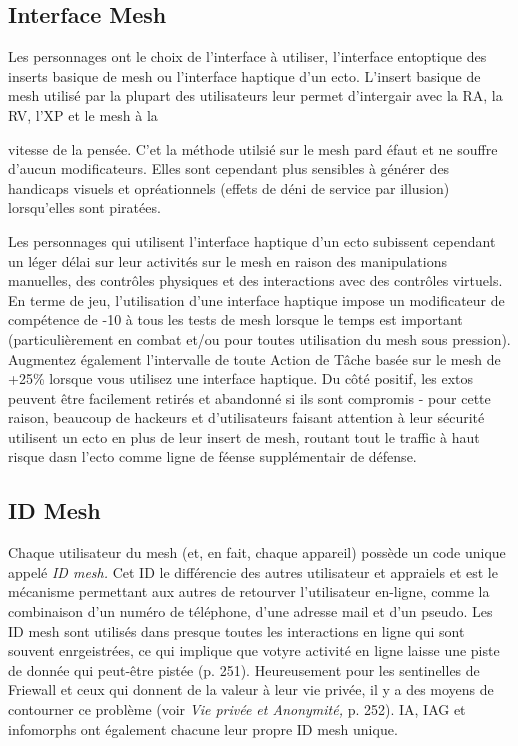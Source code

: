 \subsection{Interface Mesh} 

Les personnages ont le choix de l'interface à utiliser, l'interface entoptique des inserts basique de mesh ou l'interface haptique d'un ecto. L'insert basique de mesh utilisé par la plupart des utilisateurs leur permet d'intergair avec la RA, la RV, l'XP et le mesh à la 

vitesse de la pensée. C'et la méthode utilsié sur le mesh pard éfaut et ne souffre d'aucun modificateurs. Elles sont cependant plus sensibles à générer des handicaps visuels et opréationnels (effets de déni de service par illusion) lorsqu'elles sont piratées. 

Les personnages qui utilisent l'interface haptique d'un ecto subissent cependant un léger délai sur leur activités sur le mesh en raison des manipulations manuelles, des contrôles physiques et des interactions avec des contrôles virtuels. En terme de jeu, l'utilisation d'une interface haptique impose un modificateur de compétence de -10 à tous les tests de mesh lorsque le temps est important (particulièrement en combat et/ou pour toutes utilisation du mesh sous pression). Augmentez également l'intervalle de toute Action de Tâche basée sur le mesh de +25\% lorsque vous utilisez une interface haptique. Du côté positif, les extos peuvent être facilement retirés et abandonné si ils sont compromis - pour cette raison, beaucoup de hackeurs et d'utilisateurs faisant attention à leur sécurité utilisent un ecto en plus de leur insert de mesh, routant tout le traffic à haut risque dasn l'ecto comme ligne de féense supplémentair de défense. 

\subsection{ID Mesh} 

Chaque utilisateur du mesh (et, en fait, chaque appareil) possède un code unique appelé \textit{ID mesh.} Cet ID le différencie des autres utilisateur et appraiels et est le mécanisme permettant aux autres de retourver l'utilisateur en-ligne, comme la combinaison d'un numéro de téléphone, d'une adresse mail et d'un pseudo. Les ID mesh sont utilisés dans presque toutes les interactions en ligne qui sont souvent enrgeistrées, ce qui implique que votyre activité en ligne laisse une piste de donnée qui peut-être pistée (p. 251). Heureusement pour les sentinelles de Friewall et ceux qui donnent de la valeur à leur vie privée, il y a des moyens de contourner ce problème (voir \textit{Vie privée et Anonymité,} p. 252). IA, IAG et infomorphs ont également chacune leur propre ID mesh unique. 

